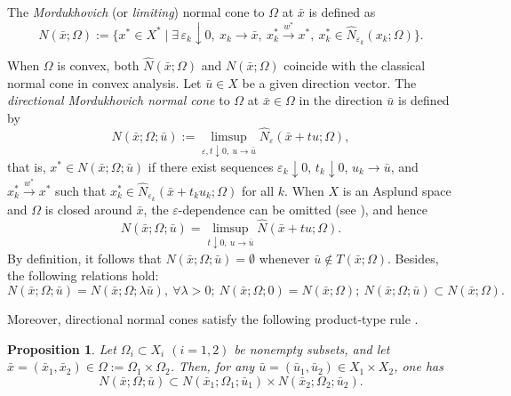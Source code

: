 \documentclass[12pt,twoside,reqno]{amsart}
\newtheorem{proposition}[theorem]{Proposition}
\theoremstyle{definition}
\numberwithin{equation}{section}
\begin{document}
The \emph{Mordukhovich} (or \emph{limiting}) normal cone to $\Omega$ at $\bar x$ is defined as
\begin{equation*}
    N(\bar x;\Omega)
    :=\big\{x^*\in X^*\mid 
    \exists\, \varepsilon_k\downarrow 0,~ x_k\to \bar x,~ x_k^*\overset{w^*}{\to} x^*,~
    x_k^*\in \hat{N}_{\varepsilon_k}(x_k;\Omega)\big\}.
\end{equation*}

When $\Omega$ is convex, both $\hat{N}(\bar x;\Omega)$ and $N(\bar x;\Omega)$ coincide with the classical normal cone in convex analysis. 
Let $\bar u\in X$ be a given direction vector. 
The \emph{directional Mordukhovich normal cone} to $\Omega$ at $\bar x\in \Omega$ in the direction $\bar u$ is defined by
\begin{equation*}
    N(\bar x;\Omega;\bar u)
    :=\limsup_{\varepsilon,t\downarrow 0,~u\to \bar u}
    \hat{N}_{\varepsilon}(\bar x+tu;\Omega),
\end{equation*}
that is, $x^*\in N(\bar x;\Omega;\bar u)$ if there exist sequences 
$\varepsilon_k\downarrow 0$, $t_k\downarrow 0$, $u_k\to \bar u$, and $x_k^*\overset{w^*}{\to}x^*$ such that 
$x_k^*\in \hat{N}_{\varepsilon_k}(\bar x+t_ku_k;\Omega)$ for all $k$. 
When $X$ is an Asplund space and $\Omega$ is closed around $\bar x$, 
the $\varepsilon$-dependence can be omitted (see \cite[Theorem~2.34]{Mordukhovich2006variational}), and hence
\begin{equation*}
    N(\bar x;\Omega;\bar u)
    =\limsup_{t\downarrow 0,~u\to \bar u}
    \hat{N}(\bar x+tu;\Omega).
\end{equation*}
By definition, it follows that $N(\bar{x}; \Omega; \bar{u}) = \emptyset$ whenever $\bar{u} \notin T(\bar{x}; \Omega)$. 
Besides, the following relations hold:
\[
N(\bar x;\Omega;\bar u)=N(\bar x;\Omega;\lambda\bar u),~\forall \lambda>0;~
N(\bar x;\Omega;0)=N(\bar x;\Omega);~
N(\bar x;\Omega;\bar u)\subset N(\bar x;\Omega).
\]

Moreover, directional normal cones satisfy the following product-type rule \cite[(3.14) and Theorem~3.7]{long2017calculus}.

\begin{proposition}\label{prop of directional normal cones of product of separated sets}
Let $\Omega_i\subset X_i$ $(i=1,2)$ be nonempty subsets, and let $\bar x=(\bar x_1,\bar x_2)\in \Omega:=\Omega_1\times \Omega_2$. 
Then, for any $\bar u=(\bar u_1,\bar u_2)\in X_1\times X_2$, one has
\begin{equation}
    N(\bar x;\Omega;\bar u)
    \subset 
    N(\bar x_1;\Omega_1;\bar u_1)\times N(\bar x_2;\Omega_2;\bar u_2).
\end{equation}
\end{proposition}
\end{document}
